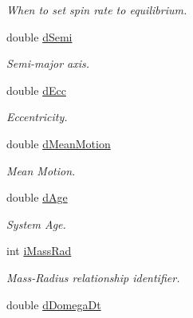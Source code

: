 \begin{DoxyCompactItemize}
\begin{DoxyCompactList}\small\item\em When to set spin rate to equilibrium. \end{DoxyCompactList}\item 
\hypertarget{struct_s_e_c_o_n_d_a_r_y_a66e4c20e8843e8d37e9cf3423eb2cb17}{}double \hyperlink{struct_s_e_c_o_n_d_a_r_y_a66e4c20e8843e8d37e9cf3423eb2cb17}{d\+Semi}\label{struct_s_e_c_o_n_d_a_r_y_a66e4c20e8843e8d37e9cf3423eb2cb17}

\begin{DoxyCompactList}\small\item\em Semi-\/major axis. \end{DoxyCompactList}\item 
\hypertarget{struct_s_e_c_o_n_d_a_r_y_ae8d6212cc63fc7dda26bad101911ca68}{}double \hyperlink{struct_s_e_c_o_n_d_a_r_y_ae8d6212cc63fc7dda26bad101911ca68}{d\+Ecc}\label{struct_s_e_c_o_n_d_a_r_y_ae8d6212cc63fc7dda26bad101911ca68}

\begin{DoxyCompactList}\small\item\em Eccentricity. \end{DoxyCompactList}\item 
\hypertarget{struct_s_e_c_o_n_d_a_r_y_a1e0d45387d57eb1e0f896ab792c65d62}{}double \hyperlink{struct_s_e_c_o_n_d_a_r_y_a1e0d45387d57eb1e0f896ab792c65d62}{d\+Mean\+Motion}\label{struct_s_e_c_o_n_d_a_r_y_a1e0d45387d57eb1e0f896ab792c65d62}

\begin{DoxyCompactList}\small\item\em Mean Motion. \end{DoxyCompactList}\item 
\hypertarget{struct_s_e_c_o_n_d_a_r_y_a8046defc8f1f03567bc87126fcffc3a3}{}double \hyperlink{struct_s_e_c_o_n_d_a_r_y_a8046defc8f1f03567bc87126fcffc3a3}{d\+Age}\label{struct_s_e_c_o_n_d_a_r_y_a8046defc8f1f03567bc87126fcffc3a3}

\begin{DoxyCompactList}\small\item\em System Age. \end{DoxyCompactList}\item 
\hypertarget{struct_s_e_c_o_n_d_a_r_y_adeab22d3647dcad5946d2ca415f018ee}{}int \hyperlink{struct_s_e_c_o_n_d_a_r_y_adeab22d3647dcad5946d2ca415f018ee}{i\+Mass\+Rad}\label{struct_s_e_c_o_n_d_a_r_y_adeab22d3647dcad5946d2ca415f018ee}

\begin{DoxyCompactList}\small\item\em Mass-\/\+Radius relationship identifier. \end{DoxyCompactList}\item 
\hypertarget{struct_s_e_c_o_n_d_a_r_y_a5085fd6414d015b846d3b1097ce9920b}{}double \hyperlink{struct_s_e_c_o_n_d_a_r_y_a5085fd6414d015b846d3b1097ce9920b}{d\+Domega\+Dt}\label{struct_s_e_c_o_n_d_a_r_y_a5085fd6414d015b846d3b1097ce9920b}


\end{DoxyCompactItemize}
